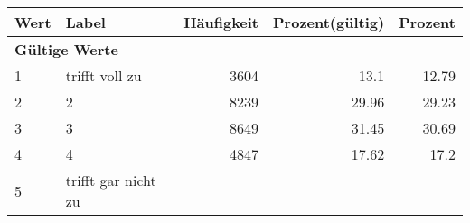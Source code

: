      \begin{longtable}{lXrrr}
     \toprule
     \textbf{Wert} & \textbf{Label} & \textbf{Häufigkeit} & \textbf{Prozent(gültig)} & \textbf{Prozent} \\
     \endhead
     \midrule
     \multicolumn{5}{l}{\textbf{Gültige Werte}}\\

     1 &
     \multicolumn{1}{X}{ trifft voll zu   } &


       \num{3604} &
       \num[round-mode=places,round-precision=2]{13.1} &
         \num[round-mode=places,round-precision=2]{12.79} \\

     2 &
     \multicolumn{1}{X}{ 2   } &


       \num{8239} &
       \num[round-mode=places,round-precision=2]{29.96} &
         \num[round-mode=places,round-precision=2]{29.23} \\

     3 &
     \multicolumn{1}{X}{ 3   } &


       \num{8649} &
       \num[round-mode=places,round-precision=2]{31.45} &
         \num[round-mode=places,round-precision=2]{30.69} \\

     4 &
     \multicolumn{1}{X}{ 4   } &


       \num{4847} &
       \num[round-mode=places,round-precision=2]{17.62} &
         \num[round-mode=places,round-precision=2]{17.2} \\

     5 &
     \multicolumn{1}{X}{ trifft gar nicht zu   } &



\end{longtable}
